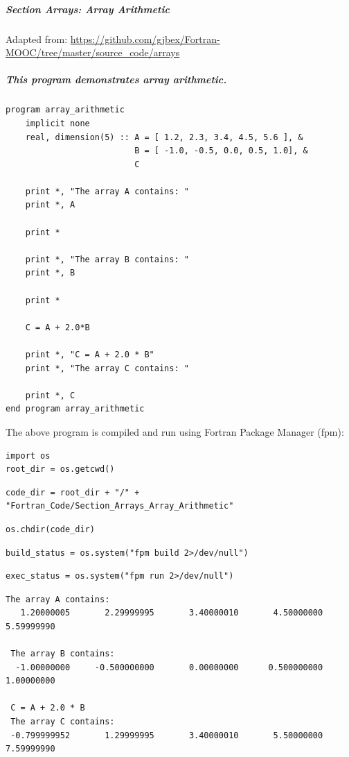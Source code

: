 \subparagraph{Section Arrays: Array Arithmetic}

Adapted from: \href{https://github.com/gjbex/Fortran-MOOC/tree/master/source\_code/arrays}{https://github.com/gjbex/Fortran-MOOC/tree/master/source\_code/arrays}

\subparagraph{This program demonstrates array arithmetic.}

\begin{verbatim}
program array_arithmetic
    implicit none
    real, dimension(5) :: A = [ 1.2, 2.3, 3.4, 4.5, 5.6 ], &
                          B = [ -1.0, -0.5, 0.0, 0.5, 1.0], &
                          C

    print *, "The array A contains: "
    print *, A

    print *

    print *, "The array B contains: "
    print *, B

    print *

    C = A + 2.0*B

    print *, "C = A + 2.0 * B"
    print *, "The array C contains: "

    print *, C
end program array_arithmetic
\end{verbatim}

The above program is compiled and run using Fortran Package Manager (fpm):

\begin{verbatim}
import os
root_dir = os.getcwd()
\end{verbatim}

\begin{verbatim}
code_dir = root_dir + "/" + "Fortran_Code/Section_Arrays_Array_Arithmetic"
\end{verbatim}

\begin{verbatim}
os.chdir(code_dir)
\end{verbatim}

\begin{verbatim}
build_status = os.system("fpm build 2>/dev/null")
\end{verbatim}

\begin{verbatim}
exec_status = os.system("fpm run 2>/dev/null")
\end{verbatim}

\begin{verbatim}
The array A contains: 
   1.20000005       2.29999995       3.40000010       4.50000000       5.59999990    

 The array B contains: 
  -1.00000000     -0.500000000       0.00000000      0.500000000       1.00000000    

 C = A + 2.0 * B
 The array C contains: 
 -0.799999952       1.29999995       3.40000010       5.50000000       7.59999990
\end{verbatim}